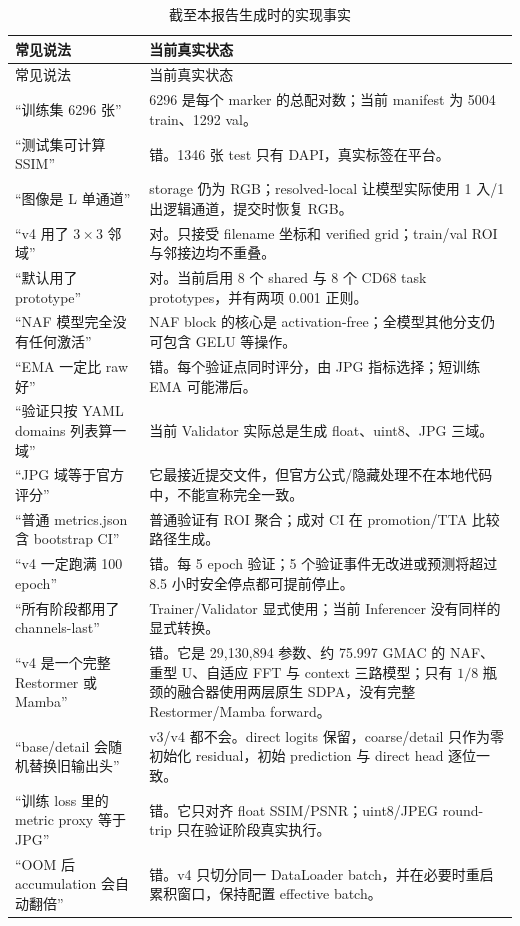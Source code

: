 \documentclass[12pt,a4paper,UTF8]{ctexart}
\begin{document}
\begin{longtable}{p{}p{}}
\caption{截至本报告生成时的实现事实}\label{tab:fact-check}\\
\toprule 常见说法 & 当前真实状态 \\
\midrule
\endfirsthead
\toprule 常见说法 & 当前真实状态 \\
\midrule
\endhead
“训练集 6296 张” & 6296 是每个 marker 的总配对数；当前 manifest 为 5004 train、1292 val。\\
“测试集可计算 SSIM” & 错。1346 张 test 只有 DAPI，真实标签在平台。\\
“图像是 L 单通道” & storage 仍为 RGB；resolved-local 让模型实际使用 1 入/1 出逻辑通道，提交时恢复 RGB。\\
“v4 用了 $3\times3$ 邻域” & 对。只接受 filename 坐标和 verified grid；train/val ROI 与邻接边均不重叠。\\
“默认用了 prototype” & 对。当前启用 8 个 shared 与 8 个 CD68 task prototypes，并有两项 0.001 正则。\\
“NAF 模型完全没有任何激活” & NAF block 的核心是 activation-free；全模型其他分支仍可包含 GELU 等操作。\\
“EMA 一定比 raw 好” & 错。每个验证点同时评分，由 JPG 指标选择；短训练 EMA 可能滞后。\\
“验证只按 YAML domains 列表算一域” & 当前 Validator 实际总是生成 float、uint8、JPG 三域。\\
“JPG 域等于官方评分” & 它最接近提交文件，但官方公式/隐藏处理不在本地代码中，不能宣称完全一致。\\
“普通 metrics.json 含 bootstrap CI” & 普通验证有 ROI 聚合；成对 CI 在 promotion/TTA 比较路径生成。\\
“v4 一定跑满 100 epoch” & 错。每 5 epoch 验证；5 个验证事件无改进或预测将超过 8.5 小时安全停点都可提前停止。\\
“所有阶段都用了 channels-last” & Trainer/Validator 显式使用；当前 Inferencer 没有同样的显式转换。\\
“v4 是一个完整 Restormer 或 Mamba” & 错。它是 29,130,894 参数、约 75.997 GMAC 的 NAF、重型 U、自适应 FFT 与 context 三路模型；只有 $1/8$ 瓶颈的融合器使用两层原生 SDPA，没有完整 Restormer/Mamba forward。\\
“base/detail 会随机替换旧输出头” & v3/v4 都不会。direct logits 保留，coarse/detail 只作为零初始化 residual，初始 prediction 与 direct head 逐位一致。\\
“训练 loss 里的 metric proxy 等于 JPG” & 错。它只对齐 float SSIM/PSNR；uint8/JPEG round-trip 只在验证阶段真实执行。\\
“OOM 后 accumulation 会自动翻倍” & 错。v4 只切分同一 DataLoader batch，并在必要时重启累积窗口，保持配置 effective batch。\\
\bottomrule
\end{longtable}
\end{document}
